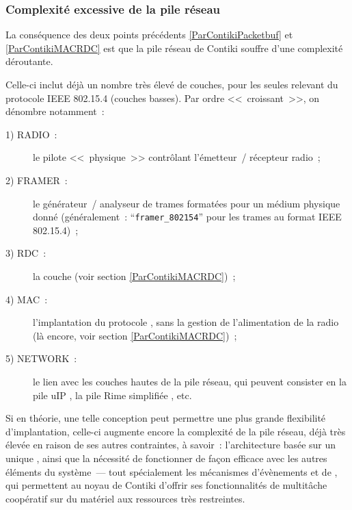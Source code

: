 \subsubsection{Complexité excessive de la pile réseau}
\label{ParContikiPileReseauComplexe}

La conséquence des deux points précédents \vref{ParContikiPacketbuf}
et \vref{ParContikiMACRDC} est que la pile réseau de Contiki souffre
d'une complexité déroutante.

Celle-ci inclut déjà un nombre très élevé de couches, pour les seules
relevant du protocole IEEE 802.15.4 (couches basses). Par ordre
<<~croissant~>>, on dénombre notamment~:

\begin{description}

\item[1) RADIO~:] le pilote <<~physique~>> contrôlant l'émetteur~/
récepteur radio~;

\item[2) FRAMER~:] le générateur~/ analyseur de trames formatées pour un
médium physique donné (généralement~: ``\texttt{framer\_802154}'' pour
les trames au format IEEE 802.15.4)~;

\item[3) RDC~:] la couche  (voir section
\vref{ParContikiMACRDC})~;

\item[4) MAC~:] l'implantation du protocole ,
sans la gestion de l'alimentation de la radio (là encore, voir section
\vref{ParContikiMACRDC})~;

\item[5) NETWORK~:] le lien avec les couches hautes de la pile réseau,
qui peuvent consister en la pile uIP \cite{uip}, la pile Rime simplifiée
\cite{Rime}, etc.

\end{description}

Si en théorie, une telle conception peut permettre une plus grande
flexibilité d'implantation, celle-ci augmente encore la complexité
de la pile réseau, déjà très élevée en raison de ses autres contraintes,
à savoir~: l'architecture basée sur un unique , ainsi
que la nécessité de fonctionner de façon efficace avec les autres éléments
du système~--- tout spécialement les mécanismes d'évènements et de
 \cite{Protothreads}, qui permettent au noyau de
Contiki d'offrir ses fonctionnalités de multitâche coopératif sur du
matériel aux ressources très restreintes.

